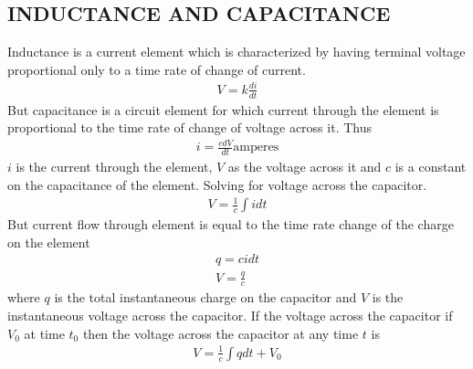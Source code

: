 \documentclass[11pt]{report}
\newcommand{\sps}{\\[0.2cm]}
\begin{document}
	\subsection{INDUCTANCE AND CAPACITANCE }
	Inductance is a current element which is characterized by having terminal voltage proportional only to a time rate of change of current.
	\begin{eqnarray}
		V = k\frac{di}{dt}
	\end{eqnarray}
	But capacitance is a circuit element for which current through the element is proportional to the time rate of change of voltage across it. Thus
	\begin{eqnarray}
		i = \frac{cdV}{dt}\text{amperes}
	\end{eqnarray}
	$i$ is the current through the element, $V$ as the voltage across it and $c$ is a constant on the capacitance of the element. Solving for voltage across the capacitor.
	\begin{eqnarray*}
		V = \frac{1}{c}\int idt
	\end{eqnarray*} 
	But current flow through element is equal to the time rate change of the charge on the element
	\begin{eqnarray*}
		q = c i dt\sps
		V = \frac{q}{c}
	\end{eqnarray*}
	where $q$ is the total instantaneous charge on the capacitor and $V$ is the instantaneous voltage across the capacitor. If the voltage across the capacitor if $V_0$ at time $t_0$ then the voltage across the capacitor at any time $t$ is
	\begin{eqnarray*}
		V = \frac{1}{c}\int qdt + V_0
	\end{eqnarray*}	
	
\end{document}
